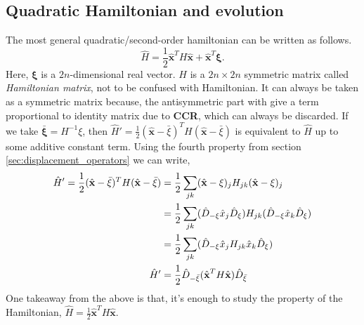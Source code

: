 \documentclass[english,10pt,a4paper]{article}
\newcommand{\xx}{\hat{\textbf{x}}}
\newcommand{\dd}[1]{\hat{D}_{#1}}
\newcommand{\ham}{\hat H}
\newcommand{\half}{\frac{1}{2}}
\begin{document}
	\subsection{Quadratic Hamiltonian and evolution}
	
	The most general quadratic/second-order hamiltonian can be written as follows.
	\begin{equation}
		\label{eq:quad_ham}
		\ham = \half \xx^T H \xx + \xx^T \mathbf{\xi}.
	\end{equation}
	Here, $\mathbf{\xi}$ is a $2n$-dimensional real vector. $H$ is a $2n\times 2n$ symmetric matrix called \textit{Hamiltonian matrix}, not to be confused with Hamiltonian. It can always be taken as  a symmetric matrix because, the antisymmetric part with give a term proportional to identity matrix due to \textbf{CCR}, which can always be discarded. If we take $\bar{\mathbf{\xi}}=H^{-1}\xi$, then $\hat{H}' = \half (\xx-\bar{\xi})^T H (\xx-\bar{\xi})$ is equivalent to $\hat{H}$ up to some additive constant term. Using the fourth property from section \ref{sec:displacement_operators} we can write,
	\begin{align}
		\hat{H}' = \half (\xx-\bar{\xi})^T H (\xx-\bar{\xi}) &= \half \sum_{jk} (\xx-\xi) _j H_{jk} (\xx-\xi) _j \notag \\
		&= \half \sum_{jk} (\dd{-\xi} \hat x_j \dd{\xi})  H_{jk} (\dd{-\xi} \hat x_k \dd{\xi})  \notag\\
		&= \half \sum_{jk} (\dd{-\xi} \hat x_j H_{jk} \hat x_k \dd{\xi}) \notag\\
		\hat{H}'&= \half \dd{-\bar{\xi}} (\xx^T H \xx) \dd{\bar{\xi}}
	\end{align} 
	One takeaway from  the above is that, it's enough to study the property of the Hamiltonian, $\hat{H} = \half \xx^T H \xx$.
	
\end{document}
